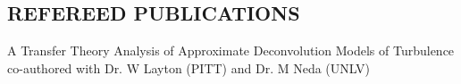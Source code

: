 \documentclass{res}
\begin{document}
\begin{resume}
 
\section{REFEREED PUBLICATIONS}
 
A Transfer Theory Analysis of Approximate Deconvolution Models of
Turbulence \\
co-authored with Dr. W Layton (PITT) and Dr. M Neda (UNLV)

\end{resume}
\end{document}
